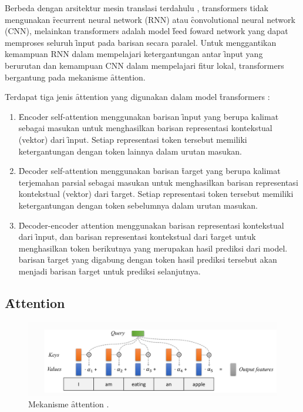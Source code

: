 Berbeda dengan arsitektur mesin translasi terdahulu \citep{RNNseq2seq}, transformers tidak mengunakan \f{recurrent neural network} (RNN) atau \f{convolutional neural network} (CNN), melainkan transformers adalah model \f{feed foward network} yang dapat memproses seluruh \f{input} pada barisan secara paralel. Untuk menggantikan kemampuan RNN dalam mempelajari ketergantungan antar \f{input} yang berurutan dan kemampuan CNN dalam mempelajari fitur lokal, transformers bergantung pada mekanisme \f{attention}.

Terdapat tiga jenis \f{attention} yang digunakan dalam model \f{transformers} \citep{transformerori}:

\begin{enumerate}
	\item \f{Encoder self-attention} menggunakan barisan \f{input} yang berupa kalimat sebagai masukan untuk menghasilkan barisan representasi kontekstual (vektor) dari \f{input}. Setiap representasi token tersebut memiliki ketergantungan dengan token lainnya dalam urutan masukan.
	\item \f{Decoder self-attention} menggunakan barisan \f{target} yang berupa kalimat terjemahan parsial sebagai masukan untuk menghasilkan barisan representasi kontekstual (vektor) dari \f{target}. Setiap representasi token tersebut memiliki ketergantungan dengan token sebelumnya dalam urutan masukan.
	\item \f{Decoder-encoder attention} menggunakan barisan representasi kontekstual dari \f{input}, dan barisan representasi kontekstual dari \f{target} untuk menghasilkan token berikutnya yang merupakan hasil prediksi dari model. barisan \f{target} yang digabung dengan token hasil prediksi tersebut akan menjadi barisan \f{target} untuk prediksi selanjutnya.
\end{enumerate}

\subsection{\f{Attention}}

\begin{figure}
	\centering
	\includegraphics[width=0.7\linewidth]{assets/pics/attention.png}
	\caption{Mekanisme \f{attention} \citep{lippe2022uvadlc}.}
	\label{fig:attention}
\end{figure}

